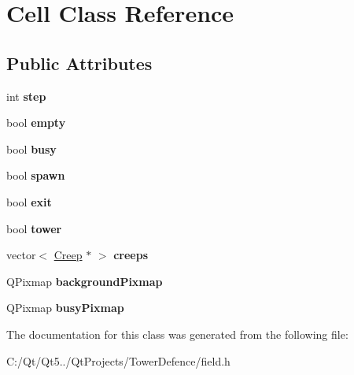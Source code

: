 \hypertarget{class_cell}{}\section{Cell Class Reference}
\label{class_cell}
\subsection*{Public Attributes}
\begin{DoxyCompactItemize}
\item 
\hypertarget{class_cell_ab859424322c6a625131c5d509f895e1c}{}int {\bfseries step}\label{class_cell_ab859424322c6a625131c5d509f895e1c}

\item 
\hypertarget{class_cell_a5692d979a5abc3556ce7624bf1c0c237}{}bool {\bfseries empty}\label{class_cell_a5692d979a5abc3556ce7624bf1c0c237}

\item 
\hypertarget{class_cell_a027e7368eced3103ddb77db6395a9dab}{}bool {\bfseries busy}\label{class_cell_a027e7368eced3103ddb77db6395a9dab}

\item 
\hypertarget{class_cell_a9cfb3e48f73e63fc702b45b942d87a6f}{}bool {\bfseries spawn}\label{class_cell_a9cfb3e48f73e63fc702b45b942d87a6f}

\item 
\hypertarget{class_cell_abb994ef4ec2ae331250229ba97c7a8aa}{}bool {\bfseries exit}\label{class_cell_abb994ef4ec2ae331250229ba97c7a8aa}

\item 
\hypertarget{class_cell_a78af3ab2c2d72cc126690fb93b0fee37}{}bool {\bfseries tower}\label{class_cell_a78af3ab2c2d72cc126690fb93b0fee37}

\item 
\hypertarget{class_cell_a8198d93f7ce7f8981582b3243c765a2b}{}vector$<$ \hyperlink{class_creep}{Creep} $\ast$ $>$ {\bfseries creeps}\label{class_cell_a8198d93f7ce7f8981582b3243c765a2b}

\item 
\hypertarget{class_cell_a5493436d5963a65c528ed8ed5dbcc736}{}Q\+Pixmap {\bfseries background\+Pixmap}\label{class_cell_a5493436d5963a65c528ed8ed5dbcc736}

\item 
\hypertarget{class_cell_ab4401ac4d49c1e69e1f251ada823e0a2}{}Q\+Pixmap {\bfseries busy\+Pixmap}\label{class_cell_ab4401ac4d49c1e69e1f251ada823e0a2}

\end{DoxyCompactItemize}


The documentation for this class was generated from the following file\+:\begin{DoxyCompactItemize}
\item 
C\+:/\+Qt/\+Qt5../\+Qt\+Projects/\+Tower\+Defence/field.\+h\end{DoxyCompactItemize}
